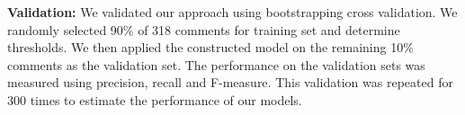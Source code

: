 



\textbf{Validation:} We validated our approach using bootstrapping cross validation. We randomly selected 90\% of 318 comments for training set and determine thresholds. We then applied the constructed model on the remaining 10\% comments as the validation set.
The performance on the validation sets was measured using precision, recall and F-measure.
This validation was repeated for 300 times to estimate the performance of our models.


